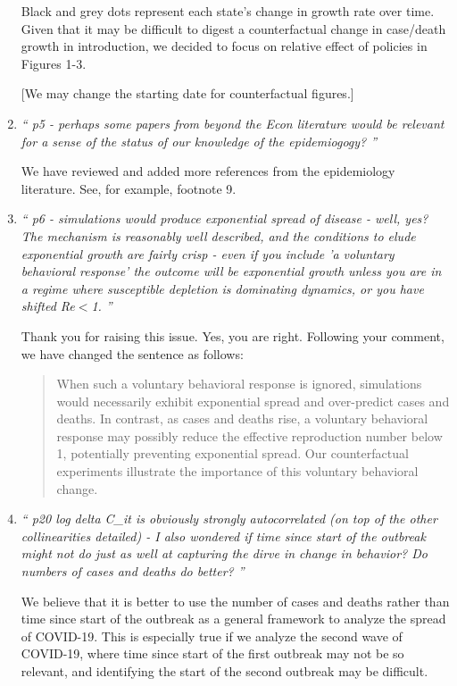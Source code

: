 \documentclass[11pt]{article}
\begin{document}
\begin{enumerate}
Black and grey dots represent each state's change in growth rate over time.  Given that it may be difficult to digest a counterfactual change in case/death growth in introduction, we decided to focus on relative effect of policies in Figures 1-3.
  
[We may change the starting date for counterfactual figures.]

\item \textit{`` p5 - perhaps some papers from beyond the Econ literature would be relevant for a sense of the status of our knowledge of the epidemiogogy?  ''}

We have reviewed and added more references from the epidemiology literature. See, for example, footnote 9.

\item \textit{`` p6 - simulations would produce exponential spread of disease - well, yes? The mechanism is reasonably well described, and the conditions to elude exponential growth are fairly crisp - even if you include 'a voluntary behavioral response' the outcome will be exponential growth unless you are in a regime where susceptible depletion is dominating dynamics, or you have shifted Re$<$1.  ''}
 
 Thank you for raising this issue. Yes, you are right. Following your comment, we have changed the sentence as follows:
\begin{quote}
When such a voluntary behavioral response is ignored, simulations would necessarily exhibit exponential spread and over-predict  cases and deaths. In contrast, as cases and deaths rise, a voluntary behavioral response may possibly reduce the effective reproduction number  below 1,  potentially preventing exponential spread. Our counterfactual experiments  illustrate the importance of this voluntary behavioral change. 
\end{quote}
 

\item \textit{`` p20 log delta C\_it is obviously strongly autocorrelated (on top of the other collinearities detailed) - I also wondered if time since start of the outbreak might not do just as well at capturing the dirve in change in behavior? Do numbers of cases and deaths do better? ''}

We believe that it is better to use the number of cases and deaths rather than time since start of the outbreak as a  general framework to analyze the spread of COVID-19. This is especially true if we analyze the second wave of COVID-19, where time since start of the first outbreak may not be so relevant, and identifying the start of the second outbreak may be difficult. 


\end{enumerate}
\end{document}
